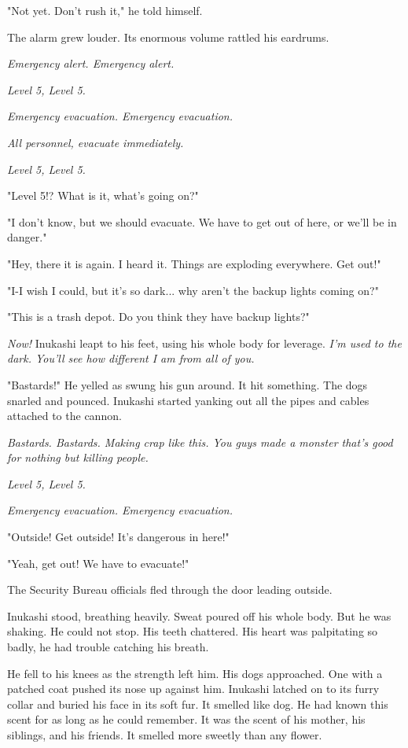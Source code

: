 "Not yet. Don't rush it," he told himself.

The alarm grew louder. Its enormous volume rattled his eardrums.

\emph{Emergency alert. Emergency alert.}

\emph{Level 5, Level 5.}

\emph{Emergency evacuation. Emergency evacuation.}

\emph{All personnel, evacuate immediately.}

\emph{Level 5, Level 5.}

"Level 5!? What is it, what's going on?"

"I don't know, but we should evacuate. We have to get out of here, or
we'll be in danger."

"Hey, there it is again. I heard it. Things are exploding everywhere.
Get out!"

"I-I wish I could, but it's so dark... why aren't the backup lights
coming on?"

"This is a trash depot. Do you think they have backup lights?"

\emph{Now!} Inukashi leapt to his feet, using his whole body for leverage. \emph{I'm
	used to the dark. You'll see how different I am from all of you.}

"Bastards!" He yelled as swung his gun around. It hit something. The
dogs snarled and pounced. Inukashi started yanking out all the pipes and
cables attached to the cannon.

\emph{Bastards. Bastards. Making crap like this. You guys made a monster
	that's good for nothing but killing people.}

\emph{Level 5, Level 5.}

\emph{Emergency evacuation. Emergency evacuation.}

"Outside! Get outside! It's dangerous in here!"

"Yeah, get out! We have to evacuate!"

The Security Bureau officials fled through the door leading outside.

Inukashi stood, breathing heavily. Sweat poured off his whole body. But
he was shaking. He could not stop. His teeth chattered. His heart was
palpitating so badly, he had trouble catching his breath.

He fell to his knees as the strength left him. His dogs approached. One
with a patched coat pushed its nose up against him. Inukashi latched on
to its furry collar and buried his face in its soft fur. It smelled like
dog. He had known this scent for as long as he could remember. It was
the scent of his mother, his siblings, and his friends. It smelled more
sweetly than any flower.

